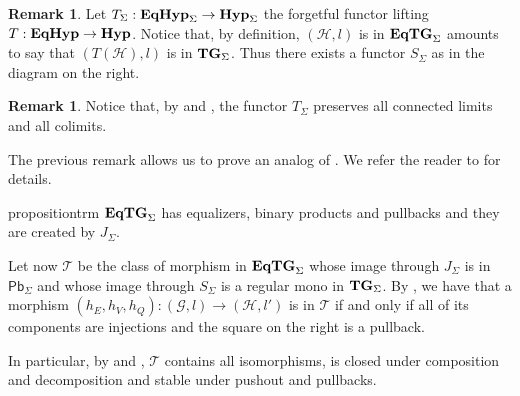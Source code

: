\documentclass[a4paper,UKenglish,cleveref,pdftex,amsthm,thm-restate,numberwithinsect]{cas-sc}
\newcommand{\pbc}{\mathsf{Pb}}
\theoremstyle{plain}
\theoremstyle{definition}
\newtheorem{remark}[theorem]{Remark}
\newcommand{\catname}[1]{\textbf{\textup{#1}}}
\newcommand{\hyp}{\catname{Hyp}}
\newcommand{\EqHyp}{\catname{EqHyp}} %
\newcommand{\EqTG}{\catname{EqTG}}
\newcommand{\tg}[0]{\catname{TG}_{\Sigma}}
\begin{document}
\noindent 
\parbox{9.5cm}{\begin{remark}\label{rem:obv}
Let $T_\Sigma:  \EqHyp_{\Sigma} \to \hyp_{\Sigma}$ the forgetful functor lifting
$T:  \EqHyp \to \hyp$.
%
Notice that, by definition, $(\mathcal{H}, l)$ is in $\EqTG_{\Sigma}$ amounts to say that $(T(\mathcal{H}), l)$ is in $\tg$. 
Thus there exists a functor $S_\Sigma$ as in the diagram on the right.
\end{remark}}
\hfill 
\parbox{4cm}{\xymatrix@R=15pt{\EqTG_{\Sigma} \ar[r]_{J_\Sigma}  \ar[d]_{S_\Sigma}& \EqHyp_\Sigma \ar[d]^{T_\Sigma} \\ \tg \ar[r]^{I_\Sigma}& \hyp_{\Sigma}}}

\begin{remark}\label{rem:t}
	Notice that, by  and , the functor $T_\Sigma$ preserves all connected limits and all colimits.
\end{remark}

 The previous remark allows us to prove an analog of . We refer the reader to  for details.
 
 \begin{restatable}{proposition}{trm}\label{prop:term}
$\EqTG_{\Sigma}$ has equalizers, binary products and pullbacks and they are created by $J_\Sigma$.
 \end{restatable}
 
\noindent
\parbox{11cm}{\hspace{15pt}Let now $\mathcal{T}$ be the class of morphism in $\EqTG_{\Sigma}$ whose image through $J_\Sigma$ is in $\pbc_\Sigma$ and whose image through $S_\Sigma$ is a regular mono in $\tg$.  By , we have that a morphism $(h_E, h_V, h_Q)\colon (\mathcal{G},l)\to (\mathcal{H}, l')$ is in $\mathcal{T}$ if and only if all of its components are injections and the square on the right is a pullback.} \hfill 
\parbox{2cm}{ }

\smallskip 
In particular, by  and , $\mathcal{T}$ contains all isomorphisms, is closed under composition and decomposition and stable under pushout and pullbacks.
\end{document}

